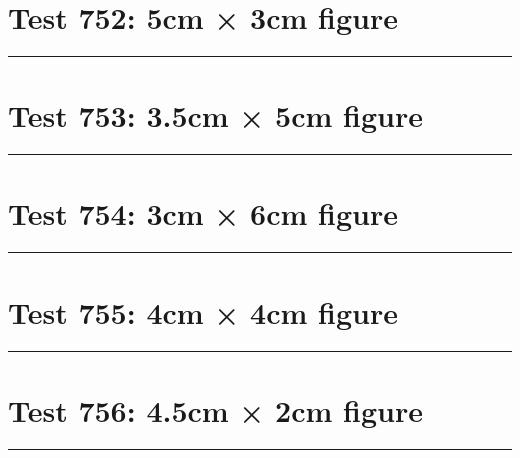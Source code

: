 \documentclass[a4paper,11pt]{article}
\begin{document}
\section*{Test 752: 5cm × 3cm figure}
\begin{swarmwrap}%
  \begin{minipage}[t]{5cm}
    \centering
    \rule{\linewidth}{3cm}
  \end{minipage}%
\end{swarmwrap}%
\swarmwrapnext
\lipsum[57]
\lipsum[58]
\lipsum[59]
\lipsum[60]
\lipsum[61]
\lipsum[62]
\section*{Test 753: 3.5cm × 5cm figure}
\begin{swarmwrap}%
  \begin{minipage}[t]{3cm}
    \centering
    \rule{\linewidth}{5cm}
  \end{minipage}%
\end{swarmwrap}%
\swarmwrapnext
\lipsum[70]
\lipsum[71]
\lipsum[72]
\lipsum[73]
\lipsum[74]
\lipsum[75]
\section*{Test 754: 3cm × 6cm figure}
\begin{swarmwrap}%
  \begin{minipage}[t]{3cm}
    \centering
    \rule{\linewidth}{6cm}
  \end{minipage}%
\end{swarmwrap}%
\swarmwrapnext
\lipsum[142]
\lipsum[143]
\lipsum[144]
\lipsum[145]
\lipsum[146]
\section*{Test 755: 4cm × 4cm figure}
\begin{swarmwrap}%
  \begin{minipage}[t]{4cm}
    \centering
    \rule{\linewidth}{4cm}
  \end{minipage}%
\end{swarmwrap}%
\swarmwrapnext
\lipsum[89]
\lipsum[90]
\lipsum[91]
\lipsum[92]
\lipsum[93]
\lipsum[94]
\section*{Test 756: 4.5cm × 2cm figure}
\begin{swarmwrap}%
  \begin{minipage}[t]{4cm}
    \centering
    \rule{\linewidth}{2cm}
  \end{minipage}%
\end{swarmwrap}%
\swarmwrapnext
\lipsum[27]
\lipsum[28]
\lipsum[29]
\end{document}
